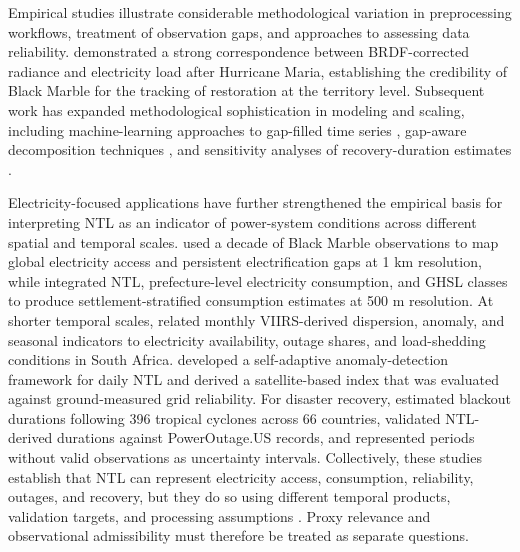\documentclass[]{interact}
\theoremstyle{plain}%
\theoremstyle{definition}
\theoremstyle{remark}
\begin{document}
    Empirical studies illustrate considerable methodological variation in preprocessing workflows, treatment of observation gaps, and approaches to assessing data reliability. \citet{Roman2019_PLOSone_Maria} demonstrated a strong correspondence between BRDF-corrected radiance and electricity load after Hurricane Maria, establishing the credibility of Black Marble for the tracking of restoration at the territory level. Subsequent work has expanded methodological sophistication in modeling and scaling, including machine-learning approaches to gap-filled time series \citep{Chakraborty2023_RSE_AdaptiveModeling}, gap-aware decomposition techniques \citep{Jia2023_IJAEO_ImprovedNTL_DisasterLoss}, and sensitivity analyses of recovery-duration estimates \citep{Zheng2025_RSE_InequalityRecovery}. 
    
    Electricity-focused applications have further strengthened the empirical basis for interpreting NTL as an indicator of power-system conditions across different spatial and temporal scales. \citet{Chakraborty2025_EF_ElectricityAccess} used a decade of Black Marble observations to map global electricity access and persistent electrification gaps at 1 km resolution, while \citet{Yang2026_Energy_UrbanRuralElectricity} integrated NTL, prefecture-level electricity consumption, and GHSL classes to produce settlement-stratified consumption estimates at 500 m resolution. At shorter temporal scales, \citet{Li2026_JGSA_SouthAfricaReliability} related monthly VIIRS-derived dispersion, anomaly, and seasonal indicators to electricity availability, outage shares, and load-shedding conditions in South Africa. \citet{Xu2026_RS_PowerReliability} developed a self-adaptive anomaly-detection framework for daily NTL and derived a satellite-based index that was evaluated against ground-measured grid reliability. For disaster recovery, \citet{Mo2025_ERIS_CycloneRecovery} estimated blackout durations following 396 tropical cyclones across 66 countries, validated NTL-derived durations against PowerOutage.US records, and represented periods without valid observations as uncertainty intervals. Collectively, these studies establish that NTL can represent electricity access, consumption, reliability, outages, and recovery, but they do so using different temporal products, validation targets, and processing assumptions \citep{Zhao2019_RS_Review,Levin2025_RSE_NTL_Agenda}. Proxy relevance and observational admissibility must therefore be treated as separate questions.
\end{document}
